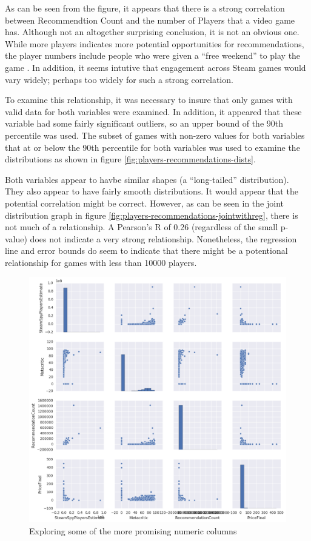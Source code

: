 \documentclass[letterpaper,10pt,twocolumn]{article}
\begin{document}
As can be seen from the figure, it appears that there is a strong correlation
between Recommendtion Count and the number of Players that a video game has.
Although not an altogether surprising conclusion, it is not an obvious one.
While more players indicates more potential opportunities for recommendations,
the player numbers include people who were given a ``free weekend'' to play
the game \cite{steamspy}. In addition, it seems intutive that engagement
across Steam games would vary widely; perhaps too widely for such a strong
correlation.

To examine this relationship, it was necessary to insure that only games with
valid data for both variables were examined. In addition, it appeared that
these variable had some fairly significant outliers, so an upper bound of the
90th percentile was used. The subset of games with non-zero values for both
variables that at or below the 90th percentile for both variables was used to
examine the distributions as shown in figure \ref{fig:players-recommendations-dists}.

Both variables appear to havbe similar shapes (a ``long-tailed''
distribution). They also appear to have fairly smooth distributions. It would
appear that the potential correlation might be correct. However, as can be
seen in the joint distribution graph in figure \ref{fig:players-recommendations-jointwithreg},
there is not much of a relationship. A Pearson's R of 0.26
(regardless of the small p-value) does not indicate a very strong
relationship. Nonetheless, the regression line and error bounds do seem to
indicate that there might be a potentional relationship for games with less
than 10000 players.

\begin{figure}[h]
    \caption{Exploring some of the more promising numeric columns}
    \label{fig:numeric-explorations}
    \includegraphics[width=\textwidth,keepaspectratio]{numeric-exploration}
\end{figure}
\end{document}
